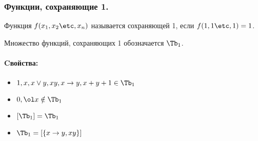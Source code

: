 \documentclass[unicode,10pt]{article}
\begin{document}
\subsubsection{Функции, сохраняющие 1.}
\begin{df}
  Функция $f(\set[x]{n})$ называется сохраняющей 1, если $f(1,1\etc,1)=1$.
\end{df}
\begin{denote}
  Множество функций, сохраняющих 1 обозначается $\Tb_1$.
\end{denote}
\paragraph{Cвойства:}
\begin{itemize}
  \item $1, x,\dn,xy,x\to y,x+y+1 \in\Tb_1$
  \item $0,\ol x \notin\Tb_1$
  \item $[\Tb_1]=\Tb_1$
  \item $\Tb_1=\cls{x\to y, xy}$
\end{itemize}
\end{document}
